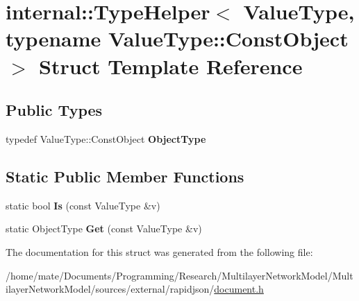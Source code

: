 \hypertarget{structinternal_1_1TypeHelper_3_01ValueType_00_01typename_01ValueType_1_1ConstObject_01_4}{}\section{internal\+:\+:Type\+Helper$<$ Value\+Type, typename Value\+Type\+:\+:Const\+Object $>$ Struct Template Reference}
\label{structinternal_1_1TypeHelper_3_01ValueType_00_01typename_01ValueType_1_1ConstObject_01_4}
\subsection*{Public Types}
\begin{DoxyCompactItemize}
\item 
typedef Value\+Type\+::\+Const\+Object {\bfseries Object\+Type}\hypertarget{structinternal_1_1TypeHelper_3_01ValueType_00_01typename_01ValueType_1_1ConstObject_01_4_a986df6ac09ceb6cc9ba9fd4d73e90495}{}\label{structinternal_1_1TypeHelper_3_01ValueType_00_01typename_01ValueType_1_1ConstObject_01_4_a986df6ac09ceb6cc9ba9fd4d73e90495}

\end{DoxyCompactItemize}
\subsection*{Static Public Member Functions}
\begin{DoxyCompactItemize}
\item 
static bool {\bfseries Is} (const Value\+Type \&v)\hypertarget{structinternal_1_1TypeHelper_3_01ValueType_00_01typename_01ValueType_1_1ConstObject_01_4_a843e707732c55f2178d399a0af13605a}{}\label{structinternal_1_1TypeHelper_3_01ValueType_00_01typename_01ValueType_1_1ConstObject_01_4_a843e707732c55f2178d399a0af13605a}

\item 
static Object\+Type {\bfseries Get} (const Value\+Type \&v)\hypertarget{structinternal_1_1TypeHelper_3_01ValueType_00_01typename_01ValueType_1_1ConstObject_01_4_ae6a797157c9b3d15ca4a32c48ea4bc73}{}\label{structinternal_1_1TypeHelper_3_01ValueType_00_01typename_01ValueType_1_1ConstObject_01_4_ae6a797157c9b3d15ca4a32c48ea4bc73}

\end{DoxyCompactItemize}


The documentation for this struct was generated from the following file\+:\begin{DoxyCompactItemize}
\item 
/home/mate/\+Documents/\+Programming/\+Research/\+Multilayer\+Network\+Model/\+Multilayer\+Network\+Model/sources/external/rapidjson/\hyperlink{document_8h}{document.\+h}\end{DoxyCompactItemize}
